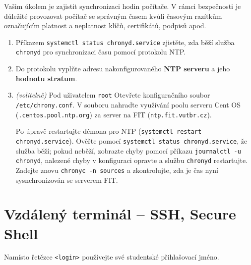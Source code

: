 \documentclass[a4paper,11pt]{article}
\begin{document}
Vašim úkolem je zajistit synchronizaci hodin počítače. V rámci bezpečnosti je
důležité provozovat počítač se správným časem kvůli časovým razítkům
označujícím platnost a neplatnost klíčů, certifikátů, podpisů apod.

\begin{enumerate}
  \item Příkazem {\tt systemctl status chronyd.service} zjistěte, zda běží služba
    \texttt{chronyd} pro synchronizaci času pomocí protokolu NTP.

  \item Do protokolu vyplňte adresu nakonfigurovaného \textbf{NTP serveru} a jeho \textbf{hodnotu stratum}.

  \item \textit{(volitelně)} Pod uživatelem \texttt{root} Otevřete
    konfiguračního soubor {\tt /etc/chrony.conf}. V souboru
    nahraďte využívání poolu serveru Cent OS ({\tt *.centos.pool.ntp.org}) za
    server na FIT ({\tt ntp.fit.vutbr.cz}).

    Po úpravě restartujte démona pro NTP ({\tt systemctl restart chronyd.service}).
    Ověřte pomocí {\tt systemctl status chronyd.service}, že služba běží; pokud
    neběží, zobrazte chyby pomocí příkazu {\tt journalctl -u chronyd}, nalezené
    chyby v konfiguraci opravte a službu {\tt chronyd} restartujte.
    Zadejte znovu {\tt chronyc -n sources} a zkontrolujte, zda je čas nyní sysnchronizován se serverem FIT.

\end{enumerate}

\section{Vzdálený terminál -- SSH, Secure Shell}

Namísto řetězce {\tt <login>} používejte své studentské přihlašovací jméno.
\end{document}
